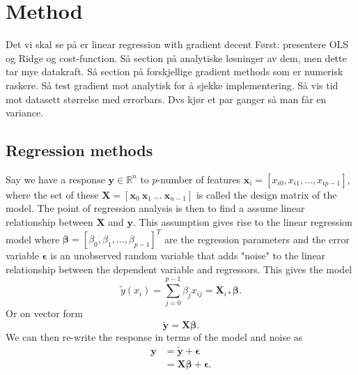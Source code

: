 \section{Method}
Det vi skal se på er linear regression with gradient decent
Først: presentere OLS og Ridge og cost-function. Så section på analytiske løsninger av dem, men dette tar mye datakraft. 
Så section på forskjellige gradient methods som er numerisk raskere. Så test gradient mot analytisk for å sjekke implementering. 
Så vis tid mot datasett størrelse med errorbars. 
Dvs kjør et par ganger så man får en variance.
\begin{comment}
	Describe the methods and algorithms. You need to
	explain how you implemented the methods and also
	say something about the structure of your algorithm
	and present some parts of your code. You should
	plug in some calculations to demonstrate your code,
	such as selected runs used to validate and verify your
	results. The latter is extremely important! A reader
	needs to understand that your code reproduces selected
	benchmarks and reproduces previous results, either
	numerical and/or well-known closed form expressions.
\end{comment}

\subsection{Regression methods}
Say we have a response $\mathbf{y}\in\mathbb{R}^n$ to $p$-number of features $\mathbf{x}_i=[x_{i0}, x_{i1},...,x_{ip-1}]$, where the set of these $\mathbf{X}=[\mathbf{x}_{0}\ \mathbf{x}_{1}\ ...\ \mathbf{x}_{n-1}]$ is called the design matrix of the model. 
The point of regression analysis is then to find a assume linear relationship between $\mathbf{X}$ and $\mathbf{y}$. 
This assumption gives rise to the linear regression model where $\boldsymbol\beta=\left[\beta_0, \beta_1, ..., \beta_{p-1} \right]^T$ are the regression parameters and the error variable $\boldsymbol\epsilon$ is an unobserved random variable that adds "noise" to the linear relationship between the dependent variable and regressors. This gives the model
\begin{equation*}
	\tilde{y}(x_i) = \sum_{j=0}^{p-1} \beta_j x_{ij}=\mathbf X_{i*}\boldsymbol{\beta}.
\end{equation*}
Or on vector form
\begin{equation*}
\boldsymbol{\tilde y} = \mathbf{X}\boldsymbol\beta.
\end{equation*}
We can then re-write the response in terms of the model and noise as
\begin{align*}
\label{eq:linear_regression}
    \mathbf{y} 
	&=\boldsymbol{\tilde y} + \boldsymbol{\epsilon}\\
	&=\mathbf{X}\boldsymbol{\beta} + \boldsymbol{\epsilon}.
\end{align*}




